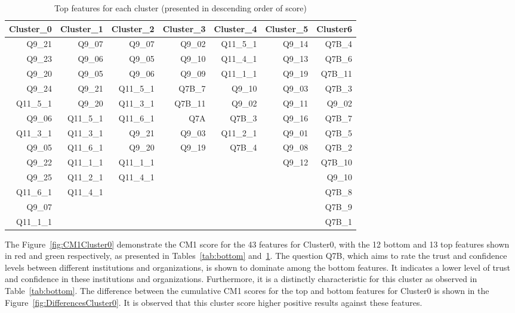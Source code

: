 \documentclass{article}
\begin{document}
\begin{table}[htbp]
  \centering
  \caption{Top features for each cluster (presented in descending order of
  score)}
    \begin{tabular}{rrrrrrr}
    \toprule
    Cluster\_0 & Cluster\_1 & Cluster\_2 & Cluster\_3 & Cluster\_4 & Cluster\_5 & Cluster6 \\
    \midrule
    Q9\_21 & Q9\_07 & Q9\_07 & Q9\_02 & Q11\_5\_1 & Q9\_14 & Q7B\_4 \\
    Q9\_23 & Q9\_06 & Q9\_05 & Q9\_10 & Q11\_4\_1 & Q9\_13 & Q7B\_6 \\
    Q9\_20 & Q9\_05 & Q9\_06 & Q9\_09 & Q11\_1\_1 & Q9\_19 & Q7B\_11 \\
    Q9\_24 & Q9\_21 & Q11\_5\_1 & Q7B\_7 & Q9\_10 & Q9\_03 & Q7B\_3 \\
    Q11\_5\_1 & Q9\_20 & Q11\_3\_1 & Q7B\_11 & Q9\_02 & Q9\_11 & Q9\_02 \\
    Q9\_06 & Q11\_5\_1 & Q11\_6\_1 & Q7A   & Q7B\_3 & Q9\_16 & Q7B\_7 \\
    Q11\_3\_1 & Q11\_3\_1 & Q9\_21 & Q9\_03 & Q11\_2\_1 & Q9\_01 & Q7B\_5 \\
    Q9\_05 & Q11\_6\_1 & Q9\_20 & Q9\_19 & Q7B\_4 & Q9\_08 & Q7B\_2 \\
    Q9\_22 & Q11\_1\_1 & Q11\_1\_1 &       &       & Q9\_12 & Q7B\_10 \\
    Q9\_25 & Q11\_2\_1 & Q11\_4\_1 &       &       &       & Q9\_10 \\
    Q11\_6\_1 & Q11\_4\_1 &       &       &       &       & Q7B\_8 \\
    Q9\_07 &       &       &       &       &       & Q7B\_9 \\
    Q11\_1\_1 &       &       &       &       &       & Q7B\_1 \\
    \bottomrule
    \end{tabular}
  \label{tab:top}
\end{table}


The Figure~\ref{fig:CM1Cluster0} demonstrate the CM1 score for the 43 features
for Cluster0, with the 12 bottom and 13 top features shown in red and green
respectively, as presented in Tables~\ref{tab:bottom} and~\ref{tab:top}. The
question Q7B, which aims to rate the trust and confidence levels between
different institutions and organizations, is shown to dominate among the bottom
features. It indicates a lower level of trust and confidence in these
institutions and organizations. Furthermore, it is a distinctly characteristic
for this cluster as observed in Table~\ref{tab:bottom}. The difference between
the cumulative CM1 scores for the top and bottom features for Cluster0 is shown
in the Figure~\ref{fig:DifferencesCluster0}. It is observed that this cluster
score higher positive results against these features.
\end{document}
